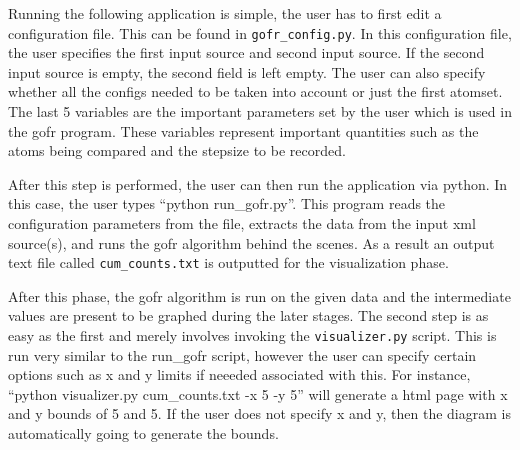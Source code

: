 Running the following application is simple, the user has to first edit a configuration file. This can be found in \verb|gofr_config.py|. In this configuration file, the user specifies the first input source and second input source. If the second input source is empty, the second field is left empty. The user can also specify whether all the configs needed to be taken into account or just the first atomset. The last 5 variables are the important parameters set by the user which is used in the gofr program. These variables represent important quantities such as the atoms being compared and the stepsize to be recorded.




After this step is performed, the user can then run the application via python. In this case, the user types ``python run_gofr.py''. This program reads the configuration parameters from the file, extracts the data from the input xml source(s), and runs the gofr algorithm behind the scenes. As a result an output text file called \verb|cum_counts.txt| is outputted for the visualization phase.





After this phase, the gofr algorithm is run on the given data and the intermediate values are present to be graphed during the later stages. The second step is as easy as the first and merely involves invoking the \verb|visualizer.py| script. This is run very similar to the run_gofr script, however the user can specify certain options such as x and y limits if neeeded associated with this. For instance, ``python visualizer.py cum_counts.txt -x 5 -y 5'' will generate a html page with x and y bounds of 5 and 5. If the user does not specify x and y, then the diagram is automatically going to generate the bounds. 
